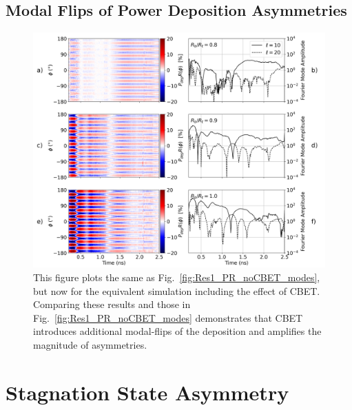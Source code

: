 \subsection{Modal Flips of Power Deposition Asymmetries}%
\label{sec:Res1_ModalFlip}

\begin{figure}[t!]
    \includegraphics[width=\linewidth]{Results1/Images/CBET_PR_modes.png}
    \centering
    \caption{This figure plots the same as Fig.~\ref{fig:Res1_PR_noCBET_modes}, but now for the equivalent simulation including the effect of \ac{CBET}.
    Comparing these results and those in Fig.~\ref{fig:Res1_PR_noCBET_modes} demonstrates that \ac{CBET} introduces additional modal-flips of the deposition and amplifies the magnitude of asymmetries.}%
    \label{fig:Res1_PR_CBET_modes}
\end{figure}


\section{Stagnation State Asymmetry}%
\label{sec:Res1_StagnationAsymm}


